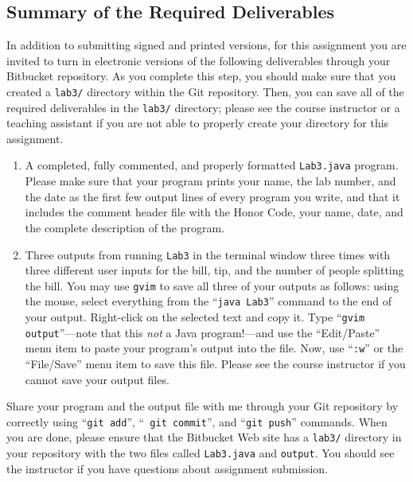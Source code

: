 \vspace{-0.2in}
\subsection*{Summary of the Required Deliverables}

In addition to submitting signed and printed versions, for this assignment you are invited to turn in electronic
versions of the following deliverables through your Bitbucket repository. As you complete this step, you should make sure
that you created a {\tt lab3/} directory within the Git repository.  Then, you can save all of the required deliverables
in the {\tt lab3/} directory; please see the course instructor or a teaching assistant if you are not able to properly
create your directory for this assignment.

\begin{enumerate}

  \setlength{\itemsep}{0pt}

        \item A completed, fully commented, and properly formatted {\tt Lab3.java} program. Please make sure that your
          program prints your name, the lab number, and the date as the first few output lines of every program you
          write, and that it includes the comment header file with the Honor Code, your name, date, and the complete
          description of the program.

        \item Three outputs from running {\tt Lab3} in the terminal window three times with three different
          user inputs for the bill, tip, and the number of people splitting the bill. You may use {\tt gvim} to save all
          three of your outputs as follows: using the mouse, select everything from the ``{\tt java Lab3}'' command to
          the end of your output.  Right-click on the selected text and copy it.  Type ``{\tt gvim output}''---note that
          this {\em not} a Java program!---and use the ``Edit/Paste'' menu item to paste your program's output into the
          file.  Now, use ``{\tt :w}'' or the ``File/Save'' menu item to save this file. Please see the course
          instructor if you cannot save your output files.

\end{enumerate}
\vspace{-0.1in}
Share your program and the output file with me through your Git repository by correctly using ``{\tt git add}'', ``{\tt
git commit}'', and ``{\tt git push}'' commands. When you are done, please ensure that the Bitbucket Web site has
a {\tt lab3/} directory in your repository with the two files called {\tt Lab3.java} and {\tt output}. You should see
the instructor if you have questions about assignment submission.

